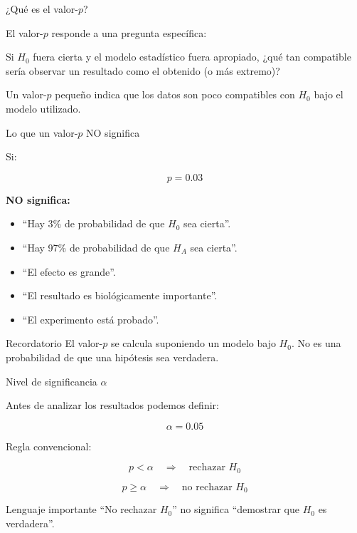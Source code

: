 \documentclass[aspectratio=169,11pt]{beamer}
\begin{document}
\begin{frame}{¿Qué es el valor-$p$?}

El valor-$p$ responde a una pregunta específica:

\begin{block}
Si $H_0$ fuera cierta y el modelo estadístico fuera apropiado,
¿qué tan compatible sería observar un resultado como el obtenido
(o más extremo)?
\end{block}

\vspace{0.4cm}

Un valor-$p$ pequeño indica que los datos son poco compatibles con
$H_0$ bajo el modelo utilizado.

\end{frame}

\begin{frame}{Lo que un valor-$p$ NO significa}

Si:

\[
p=0.03
\]

\textbf{NO significa:}

\begin{itemize}
    \item ``Hay 3\% de probabilidad de que $H_0$ sea cierta''.
    \item ``Hay 97\% de probabilidad de que $H_A$ sea cierta''.
    \item ``El efecto es grande''.
    \item ``El resultado es biológicamente importante''.
    \item ``El experimento está probado''.
\end{itemize}

\pause

\begin{alertblock}{Recordatorio}
El valor-$p$ se calcula suponiendo un modelo bajo $H_0$.
No es una probabilidad de que una hipótesis sea verdadera.
\end{alertblock}

\end{frame}

\begin{frame}{Nivel de significancia $\alpha$}

Antes de analizar los resultados podemos definir:

\[
\alpha=0.05
\]

Regla convencional:

\[
p<\alpha
\quad\Rightarrow\quad
\text{rechazar }H_0
\]

\[
p\geq\alpha
\quad\Rightarrow\quad
\text{no rechazar }H_0
\]

\begin{alertblock}{Lenguaje importante}
``No rechazar $H_0$'' no significa ``demostrar que $H_0$ es verdadera''.
\end{alertblock}

\end{frame}
\end{document}
